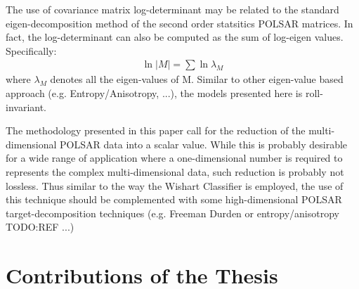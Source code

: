 The use of covariance matrix log-determinant may be related to the standard eigen-decomposition method of the second order statsitics POLSAR matrices.
In fact, the log-determinant can also be computed as the sum of log-eigen values.
Specifically:
\begin{eqnarray}
  \ln{|M|} = \sum \ln{\lambda_M}
\end{eqnarray}
where $\lambda_M$ denotes all the eigen-values of M.
Similar to other eigen-value based approach (e.g. Entropy/Anisotropy, ...),
  the models presented here is roll-invariant.

The methodology presented in this paper call for the reduction of the multi-dimensional POLSAR data into a scalar value.
While this is probably desirable for a wide range of application where a one-dimensional number is required to represents the complex multi-dimensional data,
  such reduction is probably not lossless.
Thus similar to the way the Wishart Classifier is employed,
  the use of this technique should be complemented with some high-dimensional POLSAR target-decomposition techniques (e.g. Freeman Durden or entropy/anisotropy TODO:REF ...)

\section{Contributions of the Thesis}

        

